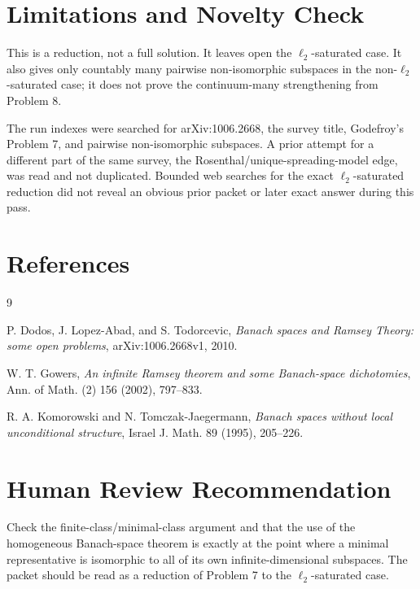 \documentclass[11pt]{article}
\begin{document}
\section*{Limitations and Novelty Check}

This is a reduction, not a full solution. It leaves open the \(\ell_2\)-saturated
case. It also gives only countably many pairwise non-isomorphic subspaces in the
non-\(\ell_2\)-saturated case; it does not prove the continuum-many strengthening
from Problem 8.

The run indexes were searched for arXiv:1006.2668, the survey title, Godefroy's
Problem 7, and pairwise non-isomorphic subspaces. A prior attempt for a different
part of the same survey, the Rosenthal/unique-spreading-model edge, was read and
not duplicated. Bounded web searches for the exact \(\ell_2\)-saturated reduction
did not reveal an obvious prior packet or later exact answer during this pass.

\section*{References}

\begin{thebibliography}{9}

P. Dodos, J. Lopez-Abad, and S. Todorcevic,
\emph{Banach spaces and Ramsey Theory: some open problems},
arXiv:1006.2668v1, 2010.

W. T. Gowers,
\emph{An infinite Ramsey theorem and some Banach-space dichotomies},
Ann. of Math. (2) 156 (2002), 797--833.

R. A. Komorowski and N. Tomczak-Jaegermann,
\emph{Banach spaces without local unconditional structure},
Israel J. Math. 89 (1995), 205--226.

\end{thebibliography}

\section*{Human Review Recommendation}

Check the finite-class/minimal-class argument and that the use of the
homogeneous Banach-space theorem is exactly at the point where a minimal
representative is isomorphic to all of its own infinite-dimensional subspaces.
The packet should be read as a reduction of Problem 7 to the
\(\ell_2\)-saturated case.
\end{document}
